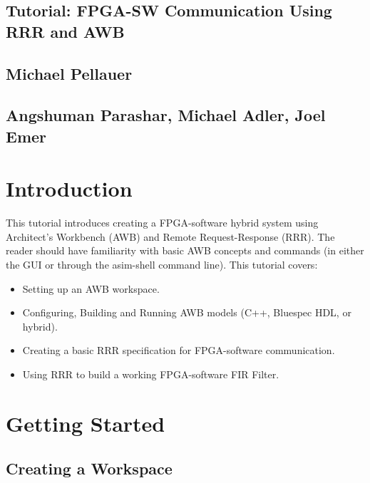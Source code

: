\documentclass{article}
\begin{document}
\begin{centering}
\section*{Tutorial: FPGA-SW Communication Using RRR and AWB}
\subsection*{Michael Pellauer}
\subsection*{Angshuman Parashar, Michael Adler, Joel Emer}
\end{centering}

\section{Introduction}

This tutorial introduces creating a FPGA-software hybrid system using Architect's Workbench (AWB) and Remote Request-Response (RRR). The reader should have
familiarity with basic AWB concepts and commands (in either the GUI or through the asim-shell command line). This tutorial covers:

\begin{itemize}
    \item Setting up an AWB workspace.
    \vspace{-7pt}
    \item Configuring, Building and Running AWB models (C++, Bluespec HDL, or hybrid).
    \vspace{-7pt}
    \item Creating a basic RRR specification for FPGA-software communication.
    \vspace{-7pt}
    \item Using RRR to build a working FPGA-software FIR Filter.
    \vspace{-7pt}
\end{itemize}

\section{Getting Started}

\subsection{Creating a Workspace}
\end{document}
